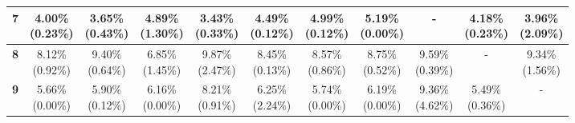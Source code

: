 \documentclass{report}
\begin{document}
\begin{center}
{\begin{tabular}{|c|c|c|c|c|c|c|c|c|c|c|}
  \textbf{7} & \makecell{4.00\% \\ (0.23\%)} & \makecell{3.65\% \\ (0.43\%)} & \makecell{4.89\% \\ (1.30\%)} & \makecell{3.43\% \\ (0.33\%)} & \makecell{4.49\% \\ (0.12\%)} & \makecell{4.99\% \\ (0.12\%)} & \makecell{5.19\% \\ (0.00\%)} & - & \makecell{4.18\% \\ (0.23\%)} & \makecell{3.96\% \\ (2.09\%)} \\ \hline
  \textbf{8} & \makecell{8.12\% \\ (0.92\%)} & \makecell{9.40\% \\ (0.64\%)} & \makecell{6.85\% \\ (1.45\%)} & \makecell{9.87\% \\ (2.47\%)} & \makecell{8.45\% \\ (0.13\%)} & \makecell{8.57\% \\ (0.86\%)} & \makecell{8.75\% \\ (0.52\%)} & \makecell{9.59\% \\ (0.39\%)} & - & \makecell{9.34\% \\ (1.56\%)} \\ \hline
  \textbf{9} & \makecell{5.66\% \\ (0.00\%)} & \makecell{5.90\% \\ (0.12\%)} & \makecell{6.16\% \\ (0.00\%)} & \makecell{8.21\% \\ (0.91\%)} & \makecell{6.25\% \\ (2.24\%)} & \makecell{5.74\% \\ (0.00\%)} & \makecell{6.19\% \\ (0.00\%)} & \makecell{9.36\% \\ (4.62\%)} & \makecell{5.49\% \\ (0.36\%)} & - \\ \hline
  \end{tabular}
}
\end{center}
\end{document}
